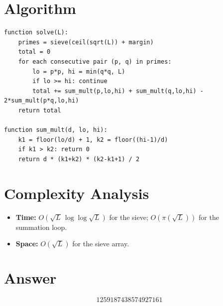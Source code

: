 \documentclass[12pt]{article}
\begin{document}
\section{Algorithm}

\begin{verbatim}
function solve(L):
    primes = sieve(ceil(sqrt(L)) + margin)
    total = 0
    for each consecutive pair (p, q) in primes:
        lo = p*p, hi = min(q*q, L)
        if lo >= hi: continue
        total += sum_mult(p,lo,hi) + sum_mult(q,lo,hi) - 2*sum_mult(p*q,lo,hi)
    return total

function sum_mult(d, lo, hi):
    k1 = floor(lo/d) + 1, k2 = floor((hi-1)/d)
    if k1 > k2: return 0
    return d * (k1+k2) * (k2-k1+1) / 2
\end{verbatim}

\section{Complexity Analysis}
\begin{itemize}
    \item \textbf{Time:} $O(\sqrt{L}\,\log\log\sqrt{L})$ for the sieve; $O(\pi(\sqrt{L}))$ for the summation loop.
    \item \textbf{Space:} $O(\sqrt{L})$ for the sieve array.
\end{itemize}

\section{Answer}

\[
\boxed{1259187438574927161}
\]
\end{document}
